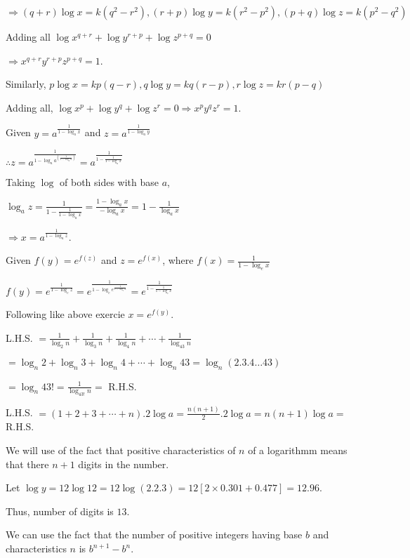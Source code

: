   $\Rightarrow (q + r)\log x = k(q^2 - r^2), (r + p)\log y = k(r^2 - p^2), (p + q)\log z = k(p^2 - q^2)$

  Adding all $\log x^{q + r} + \log y^{r + p} + \log z^{p + q} = 0$

  $\Rightarrow x^{q + r}y^{r + p}z^{p + q} = 1$.

  Similarly, $p\log x = kp(q - r), q\log y = kq(r - p), r\log z = kr(p - q)$

  Adding all, $\log x^p + \log y^q + \log z^r = 0 \Rightarrow x^py^qz^r = 1$.
\item Given $y = a^{\tfrac{1}{1 - \log_ax}}$ and $z = a^{\tfrac{1}{1 - \log_ay}}$

  $\therefore z = a^{\tfrac{1}{1 - \log_aa^{\left(\tfrac{1}{1 - \log_ax}\right)}}} = a^{\tfrac{1}{1 - \tfrac{1}{1 - \log_ax}}}$

  Taking $\log$ of both sides with base $a$,

  $\log_az = \frac{1}{1 - \tfrac{1}{1 - \log_ax}} = \frac{1 - \log_ax}{-\log_ax} = 1 - \frac{1}{\log_ax}$

  $\Rightarrow x = a^{\tfrac{1}{1 - \log_az}}$.
\item Given $f(y) = e^{f(z)}$ and $z = e^{f(x)}$, where $f(x) = \frac{1}{1 - \log_ex}$

  $f(y) = e^{\tfrac{1}{1 - \log_ez}} = e^{\tfrac{1}{1 - \log_ee^{\tfrac{1}{1 - \log_ex}}}} = e^{\tfrac{1}{1 - \tfrac{1}{1 -
      \log_ex}}}$

  Following like above exercie $x = e^{f(y)}$.
\item L.H.S. $= \frac{1}{\log_2n} + \frac{1}{\log_3n} + \frac{1}{\log_4n} + \cdots + \frac{1}{\log_{43}n}$

  $= \log_n2 + \log_n3 + \log_n4 + \cdots + \log_n43 = \log_n(2.3.4\ldots 43)$

  $= \log_n43! = \frac{1}{\log_{43!}n} =$ R.H.S.
\item L.H.S. $= (1 + 2 + 3 + \cdots + n).2\log a = \frac{n(n + 1)}{2}.2\log a = n(n + 1)\log a =$ R.H.S.
\item We will use of the fact that positive characteristics of $n$ of a logarithmm means that there $n + 1$ digits in the number.

  Let $\log y = 12\log 12 = 12\log(2.2.3) = 12[2\times0.301 + 0.477] = 12.96$.

  Thus, number of digits is $13$.
\item We can use the fact that the number of positive integers having base $b$ and characteristics $n$ is $b^{n + 1} - b^n$.

